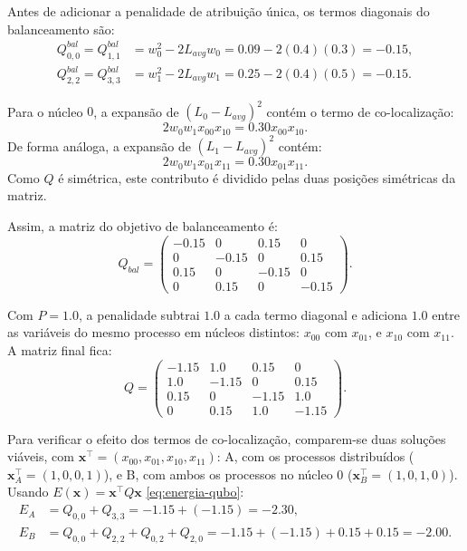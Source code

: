 Antes de adicionar a penalidade de atribuição única, os termos diagonais do balanceamento são:
\begin{equation}
\begin{aligned}
Q_{0,0}^{bal}=Q_{1,1}^{bal}
&= w_0^2 - 2L_{avg}w_0
= 0.09 - 2(0.4)(0.3)
= -0.15,\\
Q_{2,2}^{bal}=Q_{3,3}^{bal}
&= w_1^2 - 2L_{avg}w_1
= 0.25 - 2(0.4)(0.5)
= -0.15.
\end{aligned}
\end{equation}

Para o núcleo $0$, a expansão de $(L_0 - L_{avg})^2$ contém o termo de
co-localização:
\[
2w_0w_1x_{00}x_{10}=0.30x_{00}x_{10}.
\]
De forma análoga, a expansão de $(L_1 - L_{avg})^2$ contém:
\[
2w_0w_1x_{01}x_{11}=0.30x_{01}x_{11}.
\]
Como $Q$ é simétrica, este contributo é dividido pelas duas posições simétricas da matriz.

Assim, a matriz do objetivo de balanceamento é:
\begin{equation}
Q_{bal} =
\begin{pmatrix}
-0.15 & 0 & 0.15 & 0 \\
0 & -0.15 & 0 & 0.15 \\
0.15 & 0 & -0.15 & 0 \\
0 & 0.15 & 0 & -0.15
\end{pmatrix}.
\end{equation}

Com $P=1.0$, a penalidade subtrai $1.0$ a cada termo diagonal e adiciona $1.0$
entre as variáveis do mesmo processo em núcleos distintos: $x_{00}$ com $x_{01}$, e
$x_{10}$ com $x_{11}$. A matriz final fica:
\begin{equation}
Q =
\begin{pmatrix}
-1.15 & 1.0 & 0.15 & 0 \\
1.0 & -1.15 & 0 & 0.15 \\
0.15 & 0 & -1.15 & 1.0 \\
0 & 0.15 & 1.0 & -1.15
\end{pmatrix}.
\end{equation}

Para verificar o efeito dos termos de co-localização, comparem-se duas soluções
viáveis, com $\mathbf{x}^\top = (x_{00}, x_{01}, x_{10}, x_{11})$:
A, com os processos distribuídos ($\mathbf{x}_A^\top = (1,0,0,1)$), e B, com ambos
os processos no núcleo $0$ ($\mathbf{x}_B^\top = (1,0,1,0)$). Usando $E(\mathbf{x}) = \mathbf{x}^\top Q\mathbf{x}$ \eqref{eq:energia-qubo}:
\begin{equation}
\begin{aligned}
E_A &= Q_{0,0} + Q_{3,3} = -1.15 + (-1.15) = \mathbf{-2.30},\\
E_B &= Q_{0,0} + Q_{2,2} + Q_{0,2} + Q_{2,0} = -1.15+(-1.15)+0.15+0.15 = \mathbf{-2.00}.
\end{aligned}
\end{equation}

